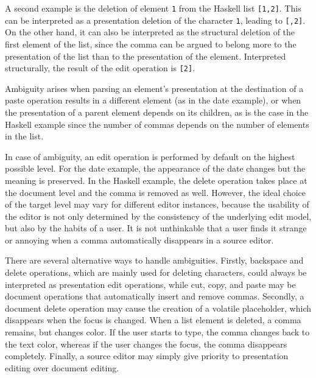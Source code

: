 A second example is the deletion of element \verb|1| from the Haskell list \verb|[1,2]|. This can be interpreted as a presentation deletion of the character \verb|1|, leading to \verb|[,2]|.  On the other hand, it can also be interpreted as the structural deletion of the first element of the list, since the comma can be argued to belong more to the presentation of the list than to the presentation of the element. Interpreted structurally, the result of the edit operation is \verb|[2]|. 

Ambiguity arises when parsing an element's presentation at the destination of a paste operation results in a different element (as in the date example), or when the presentation of a parent element depends on its children, as is the case in the Haskell example since the number of commas depends on the number of elements in the list. 


In case of ambiguity, an edit operation is performed by default on the highest possible level. For the date example, the appearance of the date changes but the meaning is preserved. In the Haskell example, the delete operation takes place at the document level and the comma is removed as well. However, the ideal choice of the target level may vary for different editor instances, because the usability of the editor is not only determined by the consistency of the underlying edit model, but also by the habits of a user. It is not unthinkable that a user finds it strange or annoying when a comma automatically disappears in a source editor. 

There are several alternative ways to handle ambiguities. Firstly, backspace and delete operations, which are mainly used for deleting characters, could always be interpreted as presentation edit operations, while cut, copy, and paste may be document operations that automatically insert and remove commas. Secondly, a document delete operation may cause the creation of a volatile placeholder, which disappears when the focus is changed. When a list element is deleted, a comma remains, but changes color. If the user starts to type, the comma changes back to the text color, whereas if the user changes the focus, the comma disappears completely. Finally, a source editor may simply give priority to presentation editing over document editing. 


